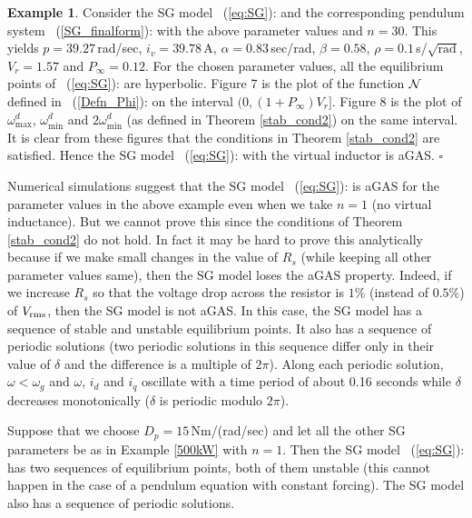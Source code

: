 \documentclass[12pt]{article}
\theoremstyle{definition}
\newtheorem{example}[theorem]{Example}
\numberwithin{equation}{section}                        %
\newcommand{\rfb}[1]{\mbox{\rm
   (\ref{#1})}\ifx\undefined\stillediting\else:\fbox{$#1$}\fi}
\newcommand{\Nscr} {{\cal N}}
\newcommand{\m}      {{\hbox{\hskip 1pt}}}
\renewcommand{\o}    {{\omega}}
\begin{document}
\begin{example}
\medskip
Consider the SG model \rfb{eq:SG} and the corresponding pendulum
system \rfb{SG_finalform} with the above parameter values and
$n=30$. This yields $p=39.27\,$rad/sec, $i_v=39.78\,$A, $\alpha=
0.83\,$sec/rad, $\beta=0.58$, $\rho=0.1\,$s/$\sqrt{\text{rad}}$,
$V_r=1.57$ and $P_\infty=0.12$. For the chosen parameter values,
all the equilibrium points of \rfb{eq:SG}
are hyperbolic. Figure 7 is the plot of the function
$\Nscr$ defined in \rfb{Defn_Phi} on the interval $(0,(1+P_\infty)
V_r]$. Figure 8 is the plot of $\o_{\max}^d$, $\o_{\min}^d$ and
$2\o_{\min}^d$ (as defined in Theorem \ref{stab_cond2}) on the same
interval. It is clear from these figures that the conditions in
Theorem \ref{stab_cond2} are satisfied. Hence the SG model \rfb{eq:SG}
with the virtual inductor is aGAS. \hfill$\square$
\end{example}

Numerical simulations suggest that the SG model \rfb{eq:SG} is aGAS
for the parameter values in the above example even when we take $n=1$
(no virtual inductance). But we cannot prove this since the conditions
of Theorem \ref{stab_cond2} do not hold. In fact it may be hard to
prove this analytically because if we make small changes in the value
of $R_s$ (while keeping all other parameter values same), then the SG
model loses the aGAS property. Indeed, if we increase $R_s$ so that
the voltage drop across the resistor is $1\%$ (instead of $0.5\%$) of
$V_{\rm rms}$, then the SG model is not aGAS. In this case, the SG
model has a sequence of stable and unstable equilibrium points.
It also has a sequence of periodic solutions (two periodic solutions
in this sequence differ only in their value of $\delta$ and the
difference is a multiple of $2\pi$). Along each periodic solution,
$\o<\o_g$ and $\o$, $i_d$ and $i_q$ oscillate with a time period of
about 0.16 seconds while $\delta$ decreases monotonically ($\delta$
is periodic modulo $2\pi$).

Suppose that we choose $D_p=15\,$N\m m/(rad/sec) and let all the other
SG parameters be as in Example \ref{500kW} with $n=1$. Then the SG
model \rfb{eq:SG} has two sequences of equilibrium points, both of
them unstable (this cannot happen in the case of a pendulum
equation with constant forcing). The SG model also has a sequence of
periodic solutions.
\end{document}
